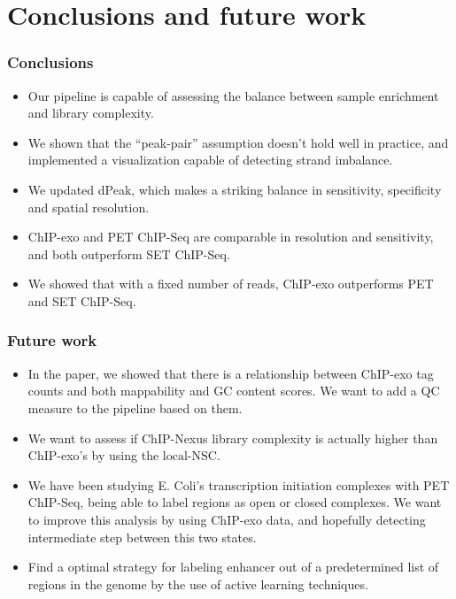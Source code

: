 \documentclass[compress,table,xcolor=dvipsnames]{beamer}\usepackage[]{graphicx}\usepackage[]{color}
\begin{document}
\section{Conclusions and future work}

\begin{frame}
  \frametitle{Conclusions}

  \begin{itemize}
  \item Our pipeline is capable of assessing the balance between
    sample enrichment and library complexity.
  \item We shown that the ``peak-pair'' assumption doesn't hold well
    in practice, and implemented a visualization capable of detecting
    strand imbalance.
  \item We updated dPeak, which makes a striking balance in
    sensitivity, specificity and spatial resolution.
  \item ChIP-exo and PET ChIP-Seq are comparable in resolution and
    sensitivity, and both outperform SET ChIP-Seq.
  \item We showed that with a fixed number of reads, ChIP-exo
    outperforms PET and SET ChIP-Seq.
  \end{itemize}
\end{frame}




\begin{frame}
\frametitle{Future work}  

\begin{itemize}
\item In the paper, we showed that there is a relationship between
  ChIP-exo tag counts and both mappability and GC content scores. We
  want to add a QC measure to the pipeline based on them.
\item We want to assess if ChIP-Nexus library complexity is actually higher than ChIP-exo's by using the $\mbox{local-NSC}$.
\item We have been studying E. Coli's transcription initiation
  complexes with PET ChIP-Seq, being able to label regions as open or
  closed complexes. We want to improve this analysis by using ChIP-exo
  data, and hopefully detecting intermediate step between this two
  states.
\item Find a optimal strategy for labeling enhancer out of a
  predetermined list of regions in the genome by the use of active
  learning techniques.
\end{itemize}

\end{frame}
\end{document}
